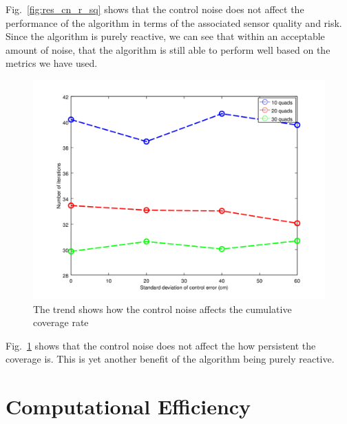 \documentclass{article}
\begin{document}
Fig.~\ref{fig:res_cn_r_sq} shows that the control noise does not affect the
performance of the algorithm in terms of the associated sensor quality and
risk. Since the algorithm is purely reactive, we can see that within an
acceptable amount of noise, that the algorithm is still able to perform well
based on the metrics we have used.

\begin{figure}

    \includegraphics[width=1\columnwidth]{tasefigs/perf_cn.png}

    \caption{The trend shows how the control noise affects the cumulative
    coverage rate}

    \label{fig:res_perf_cn}

\end{figure}

Fig.~\ref{fig:res_perf_cn} shows that the control noise does not affect the how
persistent the coverage is. This is yet another benefit of the algorithm being
purely reactive.

\section{Computational Efficiency}
\end{document}
